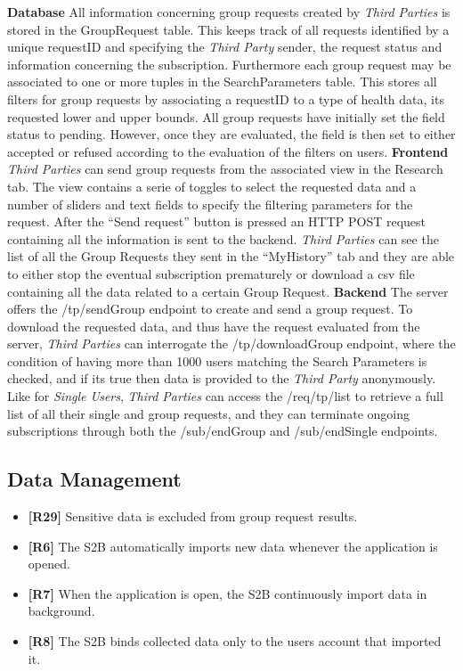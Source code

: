 \documentclass[titlepage]{article}
\begin{document}
	{\bf Database} \newline
	All information concerning group requests created by {\it Third Parties} is stored in the GroupRequest table. This keeps track of all requests identified by a unique requestID and specifying the {\it Third Party} sender, the request status and information concerning the subscription. Furthermore each group request may be associated to one or more tuples in the SearchParameters table. This stores all filters for group requests by associating a requestID to a type of health data, its requested lower and upper bounds.
	All group requests have initially set the field status to pending. However, once they are evaluated, the field is then set to either accepted or refused according to the evaluation of the filters on users.
	\newline
	\newline
	\noindent
	{\bf Frontend} \newline
	{\it Third Parties} can send group requests from the associated view in the Research tab. The view contains a serie of toggles to select the requested data and a number of sliders and text fields to specify the filtering parameters for the request. After the “Send request” button is pressed an HTTP POST request containing all the information is sent to the backend.
	{\it Third Parties} can see the list of all the Group Requests they sent in the “MyHistory” tab and they are able to either stop the eventual subscription prematurely or download a csv file containing all the data related to a certain Group Request. 
	\newline
	\newline
	\noindent
	{\bf Backend} \newline
	The server offers the /tp/sendGroup endpoint to create and send a group request. To download the requested data, and thus have the request evaluated from the server, {\it Third Parties} can interrogate the /tp/downloadGroup endpoint, where the condition of having more than 1000 users matching the Search Parameters is checked, and if it\textsc{}s true then data is provided to the {\it Third Party} anonymously.
	Like for {\it Single Users}, {\it Third Parties} can access the /req/tp/list to retrieve a full list of all their single and group requests, and they can terminate ongoing subscriptions through both the /sub/endGroup and /sub/endSingle endpoints.
	
	
	\subsection{Data Management}
	\begin{itemize}
		\item {\bf [R29]} Sensitive data is excluded from group request results. 
		\item {\bf [R6]} The S2B automatically imports new data whenever the application is opened.
		\item {\bf [R7]} When the application is open, the S2B continuously import data in background.
		\item {\bf [R8]} The S2B binds collected data only to the user\textsc{}s account that imported it. 
	\end{itemize}	
	
\end{document}
